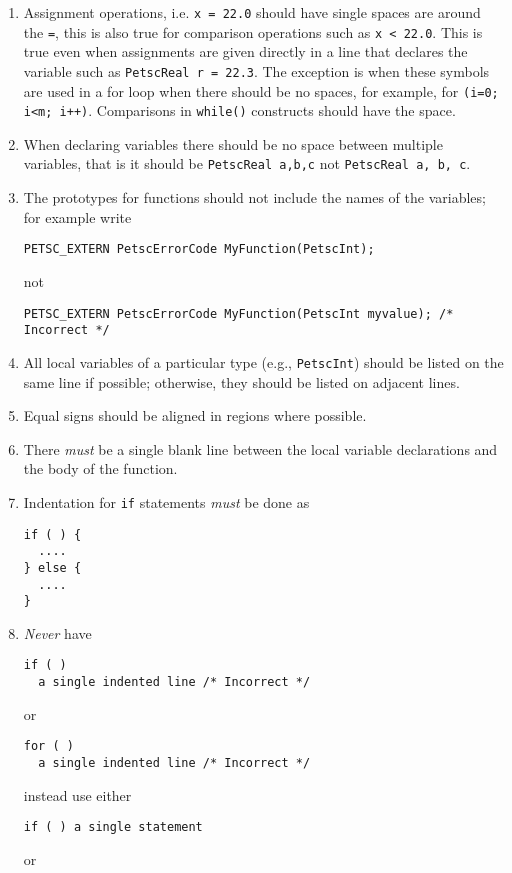 \begin{enumerate}
\item Assignment operations, i.e. \lstinline{x = 22.0} should have single spaces are around the \lstinline{=}, this is also true for
comparison operations such as \lstinline{x < 22.0}. This is true even
when assignments are given directly in a line that declares the
variable such as \lstinline{PetscReal r = 22.3}. The exception is when
these symbols are used in a for loop when there should be no spaces,
for example, for \lstinline{(i=0; i<m; i++)}. Comparisons
in \lstinline{while()} constructs should have the space.
\item When declaring variables there should be no space between multiple variables, that is it should be \lstinline{PetscReal a,b,c} not \lstinline{PetscReal a, b, c}.
\item The prototypes for functions should not include the names of the variables; for example write
\begin{lstlisting}
PETSC_EXTERN PetscErrorCode MyFunction(PetscInt);
\end{lstlisting}
not
\begin{lstlisting}
PETSC_EXTERN PetscErrorCode MyFunction(PetscInt myvalue); /* Incorrect */
\end{lstlisting}
\item All local variables of a particular type (e.g., \lstinline{PetscInt}) should be
      listed on the same line if possible; otherwise, they should be listed
      on adjacent lines.
\item Equal signs should be aligned in regions where possible.
\item There {\em must} be a single blank line
      between the local variable declarations and the body of the function.
\item Indentation for \lstinline{if} statements {\em must}  be done  as
\begin{lstlisting}
if ( ) {
  ....
} else {
  ....
}
\end{lstlisting}
\item {\em Never} have
\begin{lstlisting}
if ( ) 
  a single indented line /* Incorrect */
\end{lstlisting}
or
\begin{lstlisting}
for ( ) 
  a single indented line /* Incorrect */
\end{lstlisting}
instead use either
\begin{lstlisting}
if ( ) a single statement
\end{lstlisting}
or
\begin{lstlisting}

\end{lstlisting}
\end{enumerate}

